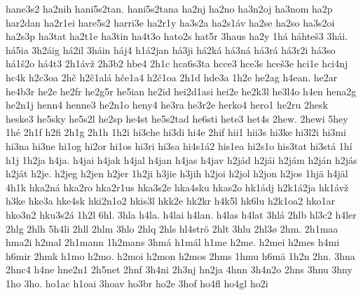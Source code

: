 {    hane3s2
    ha2nih
    hani5s2tan.
    hani5s2tana
    ha2nj
    ha2no
    ha3n2oj
    ha3nom
    ha2p
    har2dan
    ha2r1ei
    hare5s2
    harri3e
    ha2r1y
    ha3s2a
    ha2s1áv
    ha2se
    ha2so
    ha3s2oi
    ha2s3p
    ha3tat
    ha2t1e
    ha3tin
    ha4t3o
    hato2s
    hat5r
    3haus
    ha2y
    1há
    háhteš3
    3hái.
    há5ia
    3h2áig
    há2il
    3háin
    háj4
    h1á2jan
    há3ji
    há2ká
    há3ná
    há3rá
    há3r2i
    há3so
    há1š2o
    há4t3
    2h1ávž
    2h3b2
    hbe4
    2h1c
    hca6s3ta
    hcce3
    hce3s
    hceš3e
    hci1e
    hci4nj
    hc4k
    h2c3oa
    2hč
    h2č1alá
    hče1a4
    h2č1oa
    2h1d
    hde3a
    1h2e
    he2ag
    h4ean.
    he2ar
    he4b3r
    he2e
    he2fr
    he2g5r
    he5ian
    he2id
    hei2d1asi
    hei2e
    he2k3l
    he3l4o
    h4en
    hena2g
    he2n1j
    henn4
    henne3
    he2n1o
    heny4
    he3ra
    he3r2e
    herko4
    hero1
    he2ru
    2hesk
    heske3
    he5sky
    he5s2l
    he2sp
    he4st
    he5s2tad
    he6sti
    hete3
    het4s
    2hew.
    2hewi
    5hey
    1hé
    2h1f
    h2fi
    2h1g
    2h1h
    1h2i
    hi3che
    hi3di
    hi4e
    2hif
    hii1
    hii3s
    hi3ke
    hi3l2i
    hi3mi
    hi3na
    hi3ne
    hi1og
    hi2or
    hi1os
    hi3ri
    hi3sa
    hi4s1á2
    his1ea
    hi2s1o
    his3tat
    hi3stá
    1hí
    h1j
    1h2ja
    h4ja.
    h4jai
    h4jak
    h4jal
    h4jan
    h4jas
    h4jav
    h2jád
    h2jái
    h2jám
    h2ján
    h2jás
    h2ját
    h2je.
    h2jeg
    h2jen
    h2jer
    1h2ji
    h3jie
    h3jih
    h2joi
    h2jol
    h2jon
    h2jos
    1hjä
    h4jäl
    4h1k
    hka2ná
    hka2ro
    hka2r1us
    hka3s2e
    hka4sku
    hkas2o
    hk1ádj
    h2k1á2ja
    hk1ávž
    h3ke
    hke3a
    hke4sk
    hki2n1o2
    hkis3l
    hkk2e
    hk2kr
    h4k5l
    hk6lu
    h2k1oa2
    hko1ar
    hko3n2
    hku3s2á
    1h2l
    6hl.
    3hla
    h4la.
    h4lai
    h4lan.
    h4las
    h4lat
    3hlá
    2hlb
    hl3c2
    h4ler
    2hlg
    2hlh
    5h4li
    2hll
    2hlm
    3hlo
    2hlq
    2hls
    hl4strö
    2hlt
    3hlu
    2hl3ø
    2hm.
    2h1maa
    hma2i
    h2mal
    2h1mann
    1h2mans
    3hmá
    h1mál
    h1me
    h2me.
    h2mei
    h2mes
    h4mi
    h6mir
    2hmk
    h1mo
    h2mo.
    h2moi
    h2mon
    h2mos
    2hms
    1hmu
    h6mä
    1h2n
    2hn.
    3hna
    2hnc4
    h4ne
    hne2n1
    2h5net
    2hnf
    3h4ni
    2h3nj
    hn2ja
    4hnn
    3h4n2o
    2hns
    3hnu
    3hny
    1ho
    3ho.
    ho1ac
    h1oai
    3hoav
    ho3br
    ho2e
    3hof
    ho4fl
    ho4gl
    ho2i
}
